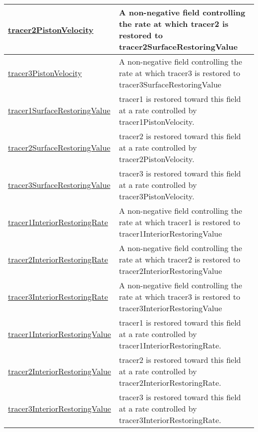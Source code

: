 {\begin{center}
\begin{longtable}{| p{2.0in} | p{4.0in} |}
    \hline
    \hyperref[subsec:var_sec_forcing_tracer2PistonVelocity]{tracer2PistonVelocity} & A non-negative field controlling the rate at which tracer2 is restored to tracer2SurfaceRestoringValue \\
    \hline
    \hyperref[subsec:var_sec_forcing_tracer3PistonVelocity]{tracer3PistonVelocity} & A non-negative field controlling the rate at which tracer3 is restored to tracer3SurfaceRestoringValue \\
    \hline
    \hyperref[subsec:var_sec_forcing_tracer1SurfaceRestoringValue]{tracer1SurfaceRestoringValue} & tracer1 is restored toward this field at a rate controlled by tracer1PistonVelocity. \\
    \hline
    \hyperref[subsec:var_sec_forcing_tracer2SurfaceRestoringValue]{tracer2SurfaceRestoringValue} & tracer2 is restored toward this field at a rate controlled by tracer2PistonVelocity. \\
    \hline
    \hyperref[subsec:var_sec_forcing_tracer3SurfaceRestoringValue]{tracer3SurfaceRestoringValue} & tracer3 is restored toward this field at a rate controlled by tracer3PistonVelocity. \\
    \hline
    \hyperref[subsec:var_sec_forcing_tracer1InteriorRestoringRate]{tracer1InteriorRestoringRate} & A non-negative field controlling the rate at which tracer1 is restored to tracer1InteriorRestoringValue \\
    \hline
    \hyperref[subsec:var_sec_forcing_tracer2InteriorRestoringRate]{tracer2InteriorRestoringRate} & A non-negative field controlling the rate at which tracer2 is restored to tracer2InteriorRestoringValue \\
    \hline
    \hyperref[subsec:var_sec_forcing_tracer3InteriorRestoringRate]{tracer3InteriorRestoringRate} & A non-negative field controlling the rate at which tracer3 is restored to tracer3InteriorRestoringValue \\
    \hline
    \hyperref[subsec:var_sec_forcing_tracer1InteriorRestoringValue]{tracer1InteriorRestoringValue} & tracer1 is restored toward this field at a rate controlled by tracer1InteriorRestoringRate. \\
    \hline
    \hyperref[subsec:var_sec_forcing_tracer2InteriorRestoringValue]{tracer2InteriorRestoringValue} & tracer2 is restored toward this field at a rate controlled by tracer2InteriorRestoringRate. \\
    \hline
    \hyperref[subsec:var_sec_forcing_tracer3InteriorRestoringValue]{tracer3InteriorRestoringValue} & tracer3 is restored toward this field at a rate controlled by tracer3InteriorRestoringRate. \\

\end{longtable}
\end{center}}
